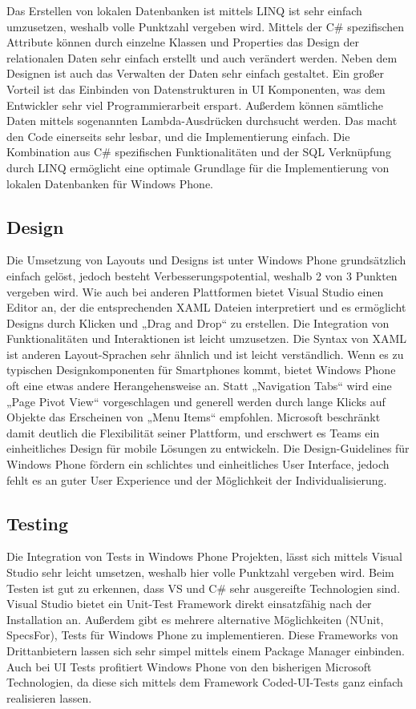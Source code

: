 Das Erstellen von lokalen Datenbanken ist mittels LINQ ist sehr einfach umzusetzen, weshalb volle Punktzahl vergeben wird. Mittels der C\# spezifischen Attribute können durch einzelne Klassen und Properties das Design der relationalen Daten sehr einfach erstellt und auch verändert werden. Neben dem Designen ist auch das Verwalten der Daten sehr einfach gestaltet. Ein großer Vorteil ist das Einbinden von Datenstrukturen in UI Komponenten, was dem Entwickler sehr viel Programmierarbeit erspart. Außerdem können sämtliche Daten mittels sogenannten Lambda-Ausdrücken durchsucht werden. Das macht den Code einerseits sehr lesbar, und die Implementierung einfach. Die Kombination aus C\# spezifischen Funktionalitäten und der SQL Verknüpfung durch LINQ ermöglicht eine optimale Grundlage für die Implementierung von lokalen Datenbanken für Windows Phone. 

\subsection{Design}

Die Umsetzung von Layouts und Designs ist unter Windows Phone grundsätzlich einfach gelöst, jedoch besteht Verbesserungspotential, weshalb 2 von 3 Punkten vergeben wird. Wie auch bei anderen Plattformen bietet Visual Studio einen Editor an, der die entsprechenden XAML Dateien interpretiert und es ermöglicht Designs durch Klicken und „Drag and Drop“ zu erstellen. Die Integration von Funktionalitäten und Interaktionen ist leicht umzusetzen. Die Syntax von XAML ist anderen Layout-Sprachen sehr ähnlich und ist leicht verständlich. Wenn es zu typischen Designkomponenten für Smartphones kommt, bietet Windows Phone oft eine etwas andere Herangehensweise an. Statt „Navigation Tabs“ wird eine „Page Pivot View“ vorgeschlagen und generell werden durch lange Klicks auf Objekte das Erscheinen von „Menu Items“ empfohlen. Microsoft beschränkt damit deutlich die Flexibilität seiner Plattform, und erschwert es Teams ein einheitliches Design für mobile Lösungen zu entwickeln. Die Design-Guidelines für Windows Phone fördern ein schlichtes und einheitliches User Interface, jedoch fehlt es an guter User Experience und der Möglichkeit der Individualisierung.

\subsection{Testing}

Die Integration von Tests in Windows Phone Projekten, lässt  sich mittels Visual Studio sehr leicht umsetzen, weshalb hier volle Punktzahl vergeben wird. Beim Testen ist gut zu erkennen, dass VS und C\# sehr ausgereifte Technologien sind. Visual Studio bietet ein Unit-Test Framework direkt einsatzfähig nach der Installation an. Außerdem gibt es mehrere alternative Möglichkeiten (NUnit, SpecsFor), Tests für Windows Phone zu implementieren. Diese Frameworks von Drittanbietern lassen sich sehr simpel mittels einem Package Manager einbinden. Auch bei UI Tests profitiert Windows Phone von den bisherigen Microsoft Technologien, da diese sich mittels dem Framework Coded-UI-Tests ganz einfach realisieren lassen. 
